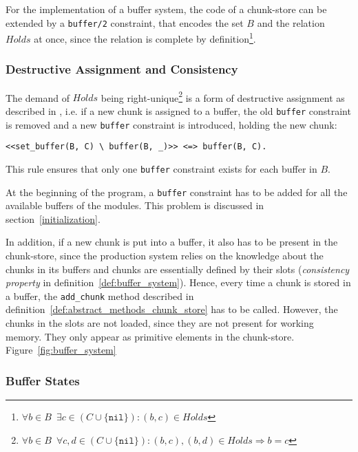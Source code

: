 For the implementation of a buffer system, the code of a chunk-store can be extended by a \lstinline|buffer/2| constraint, that encodes the set $B$ and the relation $Holds$ at once, since the relation is complete by definition\footnote{$\forall b \in B \enspace \exists c \in (C \cup \{ \mathtt{nil} \}): (b,c) \in Holds$}.

\subsubsection{Destructive Assignment and Consistency}
\label{destructive_assignment}

The demand of $Holds$ being right-unique\footnote{$\forall b \in B \enspace \forall c, d \in (C \cup \{ \mathtt{nil} \}): (b,c), (b,d) \in Holds \Rightarrow b = c$} is a form of destructive assignment as described in \cite[p. 32]{fru_chr_book_2009}, i.e. if a new chunk is assigned to a buffer, the old \lstinline|buffer| constraint is removed and a new \lstinline|buffer| constraint is introduced, holding the new chunk:

\begin{lstlisting}
<<set_buffer(B, C) \ buffer(B, _)>> <=> buffer(B, C).
\end{lstlisting}

This rule ensures that only one \lstinline|buffer| constraint exists for each buffer in $B$.

At the beginning of the program, a \lstinline|buffer| constraint has to be added for all the available buffers of the modules. This problem is discussed in section~\ref{initialization}.

In addition, if a new chunk is put into a buffer, it also has to be present in the chunk-store, since the production system relies on the knowledge about the chunks in its buffers and chunks are essentially defined by their slots (\emph{consistency property} in definition~\ref{def:buffer_system}). Hence, every time a chunk is stored in a buffer, the \lstinline|add_chunk| method described in definition~\ref{def:abstract_methods_chunk_store} has to be called. However, the chunks in the slots are not loaded, since they are not present for working memory. They only appear as primitive elements in the chunk-store. Figure~\ref{fig:buffer_system}


\subsubsection{Buffer States}

